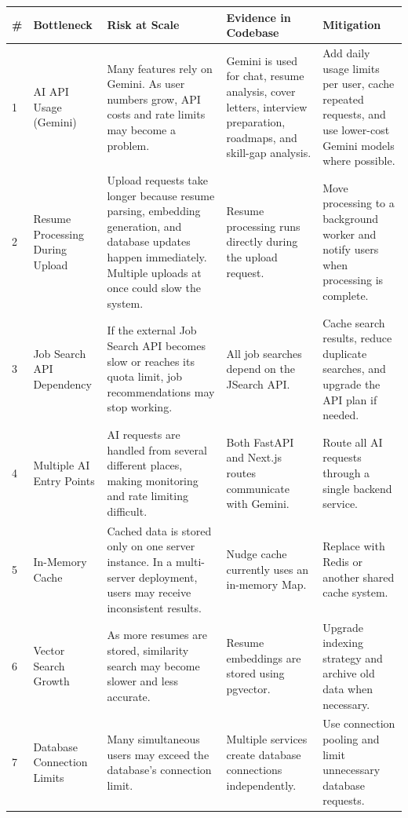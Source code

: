 \documentclass[11pt,a4paper]{article}
\begin{document}
{\footnotesize
\begin{longtable}{@{}p{5mm} p{22mm} p{30mm} p{32mm} p{32mm}@{}}
\toprule
\textbf{\#} & \textbf{Bottleneck} & \textbf{Risk at Scale} & \textbf{Evidence in Codebase} & \textbf{Mitigation} \\
\midrule
\endhead

1 &
AI API Usage (Gemini) &
Many features rely on Gemini. As user numbers grow, API costs and rate limits may become a problem. &
Gemini is used for chat, resume analysis, cover letters, interview preparation, roadmaps, and skill-gap analysis. &
Add daily usage limits per user, cache repeated requests, and use lower-cost Gemini models where possible. \\[2pt]

2 &
Resume Processing During Upload &
Upload requests take longer because resume parsing, embedding generation, and database updates happen immediately. Multiple uploads at once could slow the system. &
Resume processing runs directly during the upload request. &
Move processing to a background worker and notify users when processing is complete. \\[2pt]

3 &
Job Search API Dependency &
If the external Job Search API becomes slow or reaches its quota limit, job recommendations may stop working. &
All job searches depend on the JSearch API. &
Cache search results, reduce duplicate searches, and upgrade the API plan if needed. \\[2pt]

4 &
Multiple AI Entry Points &
AI requests are handled from several different places, making monitoring and rate limiting difficult. &
Both FastAPI and Next.js routes communicate with Gemini. &
Route all AI requests through a single backend service. \\[2pt]

5 &
In-Memory Cache &
Cached data is stored only on one server instance. In a multi-server deployment, users may receive inconsistent results. &
Nudge cache currently uses an in-memory Map. &
Replace with Redis or another shared cache system. \\[2pt]

6 &
Vector Search Growth &
As more resumes are stored, similarity search may become slower and less accurate. &
Resume embeddings are stored using pgvector. &
Upgrade indexing strategy and archive old data when necessary. \\[2pt]

7 &
Database Connection Limits &
Many simultaneous users may exceed the database's connection limit. &
Multiple services create database connections independently. &
Use connection pooling and limit unnecessary database requests. \\[2pt]


\end{longtable}}
\end{document}
